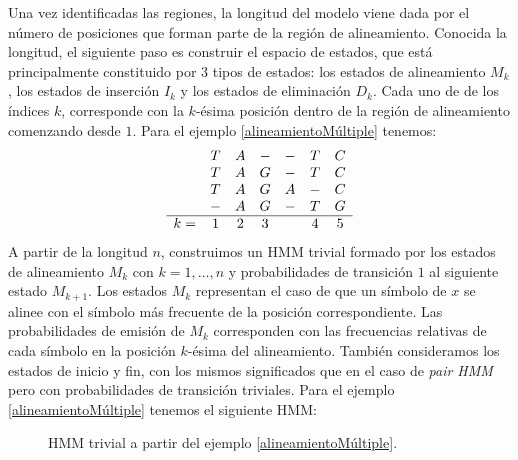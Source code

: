 Una vez identificadas las regiones, la longitud del modelo viene dada por el número de posiciones que forman parte de la región de alineamiento. Conocida la longitud, el siguiente paso es construir el espacio de estados, que está principalmente constituido por $3$ tipos de estados: los estados de alineamiento $M_k$, los estados de inserción $I_k$ y los estados de eliminación $D_k$. Cada uno de de los índices $k$, corresponde con la $k$-ésima posición dentro de la región de alineamiento comenzando desde $1$. 
Para el ejemplo \ref{alineamientoMúltiple} tenemos:
\[\begin{array}{c c c c c c c}
   & T & A & - & -  & T & C \\
   & T & A & G & -  & T & C \\
   & T & A & G & A  & - & C \\
   & - & A & G & -  & T & G \\
   \hline
  k= & 1 & 2 & 3 & & 4 & 5 
\end{array}\]   
A partir de la longitud $n$, construimos un HMM trivial formado por los estados de alineamiento $M_k$ con $k=1,\dots, n$ y probabilidades de transición $1$ al siguiente estado $M_{k+1}$. Los estados $M_k$ representan el caso de que un símbolo de $x$ se alinee con el símbolo más frecuente de la posición correspondiente. Las probabilidades de emisión de $M_k$ corresponden con las frecuencias relativas de cada símbolo en la posición $k$-ésima del alineamiento. También consideramos los estados de inicio y fin, con los mismos significados que en el caso de \textit{pair HMM} pero con probabilidades de transición triviales. Para el ejemplo \ref{alineamientoMúltiple} tenemos el siguiente HMM:

\begin{figure}[H]
\centering
{}
\caption{HMM trivial a partir del ejemplo \ref{alineamientoMúltiple}.}
\end{figure}

